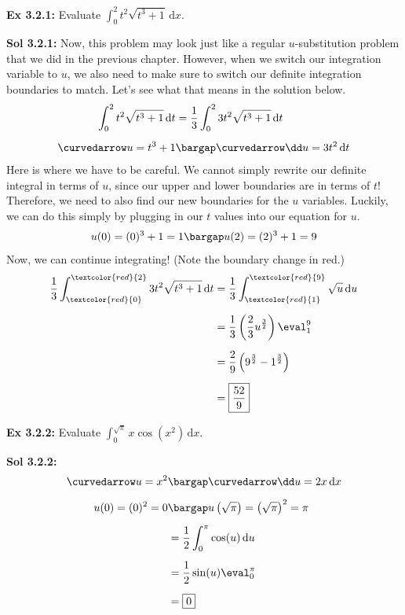 \begin{tcolorbox}[example]
    \textbf{Ex 3.2.1: } Evaluate $\int_0^2 t^2\sqrt{t^3 + 1} \,\mathrm{d}x$.
\end{tcolorbox}
\begin{tcolorbox}[solution]
    \textbf{Sol 3.2.1: } Now, this problem may look just like a regular $u$-substitution problem that we did in the previous chapter. However, when we switch our integration variable to $u$, we also need to make sure to switch our definite integration boundaries to match. Let's see what that means in the solution below. \begin{align*}
        \int_0^2 t^2\sqrt{t^3 + 1} \,\mathrm{d}t &= \dfrac{1}{3}\int_0^2 3t^2\sqrt{t^3 + 1} \,\mathrm{d}t \\[5.5pt]
        \curvedarrow u = t^3 + 1 &\bargap \curvedarrow \dd u = 3t^2 \,\mathrm{d}t
    \end{align*}
    Here is where we have to be careful. We cannot simply rewrite our definite integral in terms of $u$, since our upper and lower boundaries are in terms of $t$! Therefore, we need to also find our new boundaries for the $u$ variables. Luckily, we can do this simply by plugging in our $t$ values into our equation for $u$. \begin{align*}
        u(0) = (0)^3 + 1 = 1 \bargap u(2) = (2)^3 + 1 = 9
    \end{align*}
    Now, we can continue integrating! (Note the boundary change in red.) \begin{align*}
        \dfrac{1}{3}\int_{\textcolor{red}{0}}^{\textcolor{red}{2}} 3t^2\sqrt{t^3 + 1} \,\mathrm{d}t &= \dfrac{1}{3}\int_{\textcolor{red}{1}}^{\textcolor{red}{9}} \sqrt{u} \,\mathrm{d}u \\[5.5pt]
        & = \dfrac{1}{3}\left(\dfrac{2}{3}u^{\frac{3}{2}}\right) \eval_1^9 \\[5.5pt]
        & = \dfrac{2}{9}\left(9^{\frac{3}{2}} - 1^{\frac{3}{2}}\right) \\[5.5pt]
        & = \boxed{\dfrac{52}{9}}
    \end{align*}
\end{tcolorbox} \vspace{11pt}

\begin{tcolorbox}[example]
    \textbf{Ex 3.2.2: } Evaluate $\int_0^{\sqrt{\pi}} x\cos \left(x^2\right) \,\mathrm{d}x$.
\end{tcolorbox}
\begin{tcolorbox}[solution]
    \textbf{Sol 3.2.2: } \begin{align*}
        \curvedarrow u = x^2 &\bargap \curvedarrow \dd u = 2x \,\mathrm{d}x \\[5.5pt]
        u(0) = (0)^2 = 0 &\bargap u\left(\sqrt{\pi}\right) = \left(\sqrt{\pi}\right)^2 = \pi \\[5.5pt]
        & = \dfrac{1}{2}\int_0^{\pi} \cos (u) \,\mathrm{d}u \\[5.5pt]
        & = \dfrac{1}{2}\sin (u) \eval_0^{\pi} \\[5.5pt]
        & = \boxed{0} 
    \end{align*}
\end{tcolorbox} \vspace{11pt}

